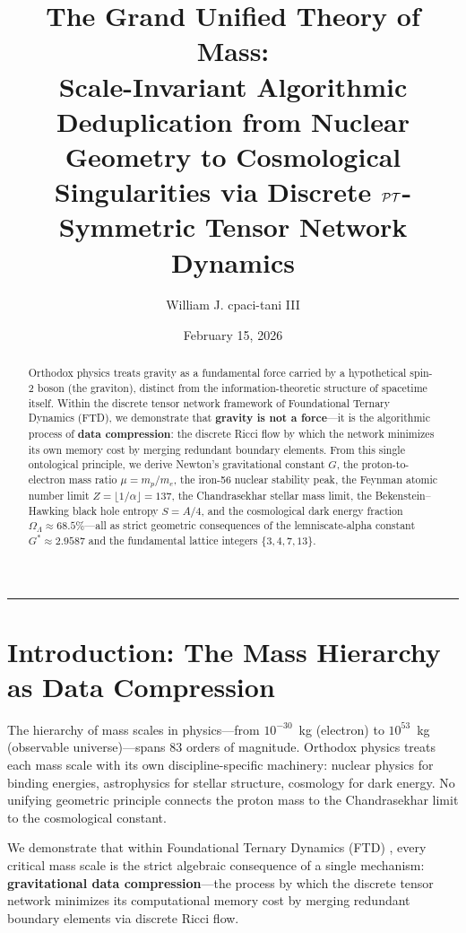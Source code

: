\documentclass[11pt, letterpaper]{article}
\title{\vspace{-3em}\textbf{The Grand Unified Theory of Mass:\\ \large Scale-Invariant Algorithmic Deduplication from Nuclear Geometry to Cosmological Singularities via Discrete $\mathcal{PT}$-Symmetric Tensor Network Dynamics}}
\author[1]{William J. cpaci-tani III}
\affil[1]{\textit{Foundational Ternary Dynamics Research}}
\date{February 15, 2026}
\newcommand{\G}{G^*}
\theoremstyle{definition}
\theoremstyle{remark}
\begin{document}
\maketitle

\begin{abstract}
Orthodox physics treats gravity as a fundamental force carried by a hypothetical spin-2 boson (the graviton), distinct from the information-theoretic structure of spacetime itself. Within the discrete tensor network framework of Foundational Ternary Dynamics (FTD), we demonstrate that \textbf{gravity is not a force}---it is the algorithmic process of \textbf{data compression}: the discrete Ricci flow by which the network minimizes its own memory cost by merging redundant boundary elements. From this single ontological principle, we derive Newton's gravitational constant $G$, the proton-to-electron mass ratio $\mu = m_p/m_e$, the iron-56 nuclear stability peak, the Feynman atomic number limit $Z = \lfloor 1/\alpha \rfloor = 137$, the Chandrasekhar stellar mass limit, the Bekenstein--Hawking black hole entropy $S = A/4$, and the cosmological dark energy fraction $\Omega_\Lambda \approx 68.5\%$---all as strict geometric consequences of the lemniscate-alpha constant $\G \approx 2.9587$ and the fundamental lattice integers $\{3, 4, 7, 13\}$.
\end{abstract}

\vspace{1em}
\hrule
\vspace{1.5em}

\section{Introduction: The Mass Hierarchy as Data Compression}

The hierarchy of mass scales in physics---from $10^{-30}$~kg (electron) to $10^{53}$~kg (observable universe)---spans 83 orders of magnitude. Orthodox physics treats each mass scale with its own discipline-specific machinery: nuclear physics for binding energies, astrophysics for stellar structure, cosmology for dark energy. No unifying geometric principle connects the proton mass to the Chandrasekhar limit to the cosmological constant.

We demonstrate that within Foundational Ternary Dynamics (FTD) \cite{cpaci-tani2026_Zenodo}, every critical mass scale is the strict algebraic consequence of a single mechanism: \textbf{gravitational data compression}---the process by which the discrete tensor network minimizes its computational memory cost by merging redundant boundary elements via discrete Ricci flow.
\end{document}
